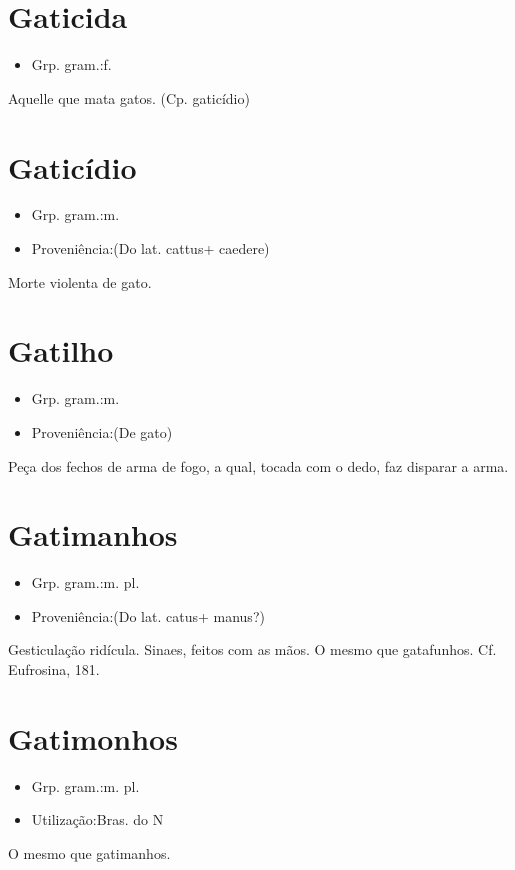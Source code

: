 \section{Gaticida}
\begin{itemize}
\item {Grp. gram.:f.}
\end{itemize}
Aquelle que mata gatos.
(Cp. \textunderscore gaticídio\textunderscore )
\section{Gaticídio}
\begin{itemize}
\item {Grp. gram.:m.}
\end{itemize}
\begin{itemize}
\item {Proveniência:(Do lat. \textunderscore cattus\textunderscore  + \textunderscore caedere\textunderscore )}
\end{itemize}
Morte violenta de gato.
\section{Gatilho}
\begin{itemize}
\item {Grp. gram.:m.}
\end{itemize}
\begin{itemize}
\item {Proveniência:(De \textunderscore gato\textunderscore )}
\end{itemize}
Peça dos fechos de arma de fogo, a qual, tocada com o dedo, faz disparar a arma.
\section{Gatimanhos}
\begin{itemize}
\item {Grp. gram.:m. pl.}
\end{itemize}
\begin{itemize}
\item {Proveniência:(Do lat. \textunderscore catus\textunderscore  + \textunderscore manus\textunderscore ?)}
\end{itemize}
Gesticulação ridícula.
Sinaes, feitos com as mãos.
O mesmo que \textunderscore gatafunhos\textunderscore . Cf. \textunderscore Eufrosina\textunderscore , 181.
\section{Gatimonhos}
\begin{itemize}
\item {Grp. gram.:m. pl.}
\end{itemize}
\begin{itemize}
\item {Utilização:Bras. do N}
\end{itemize}
O mesmo que \textunderscore gatimanhos\textunderscore .

